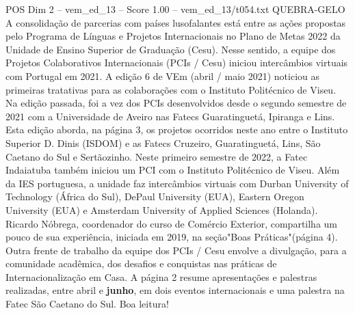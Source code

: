 \begin{textsample}{POS Dim 2 – vem\_ed\_13 – Score 1.00 – vem\_ed\_13/t054.txt}  \label{ex:f2_pos_075}
QUEBRA-GELO A consolidação de parcerias com países lusofalantes está entre as ações propostas pelo Programa de Línguas e Projetos Internacionais no Plano de Metas 2022 da Unidade de Ensino Superior de Graduação (Cesu).
Nesse sentido, a equipe dos Projetos Colaborativos Internacionais (PCIs / Cesu) iniciou intercâmbios virtuais com Portugal em 2021.
A edição 6 de VEm (abril / maio 2021) noticiou as primeiras tratativas para as colaborações com o Instituto Politécnico de Viseu.
Na edição passada, foi a vez dos PCIs desenvolvidos desde o segundo semestre de 2021 com a Universidade de Aveiro nas Fatecs Guaratinguetá, Ipiranga e Lins.
Esta edição aborda, na página 3, os projetos ocorridos neste ano entre o Instituto Superior D.
Dinis (ISDOM) e as Fatecs Cruzeiro, Guaratinguetá, Lins, São Caetano do Sul e Sertãozinho.
Neste primeiro semestre de 2022, a Fatec Indaiatuba também iniciou um PCI com o Instituto Politécnico de Viseu.
Além da IES portuguesa, a unidade faz intercâmbios virtuais com Durban University of Technology (África do Sul), DePaul University (EUA), Eastern Oregon University (EUA) e Amsterdam University of Applied Sciences (Holanda).
Ricardo Nóbrega, coordenador do curso de Comércio Exterior, compartilha um pouco de sua experiência, iniciada em 2019, na seção"Boas Práticas"(página 4).
Outra frente de trabalho da equipe dos PCIs / Cesu envolve a divulgação, para a comunidade acadêmica, dos desafios e conquistas nas práticas de Internacionalização em Casa.
A página 2 resume apresentações e palestras realizadas, entre abril e \textbf{junho}, em dois eventos internacionais e uma palestra na Fatec São Caetano do Sul.
Boa leitura!

\end{textsample}
